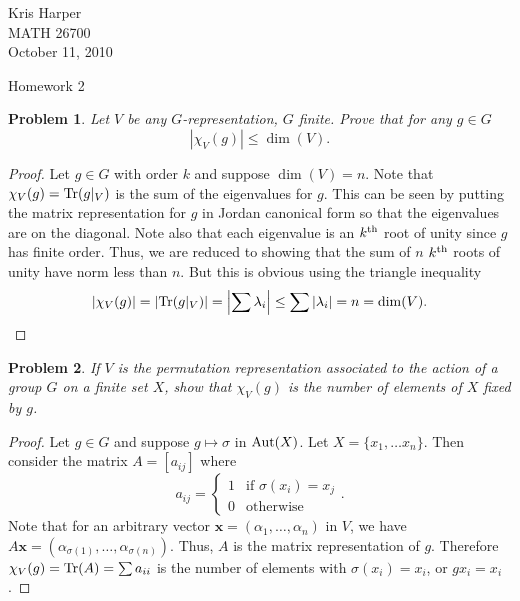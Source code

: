 \documentclass{article}
\newtheorem{problem}{Problem}
\renewcommand{\th}{^{\textup{th}}}
\newcommand{\tr}{\textup{Tr}}
\newcommand{\aut}{\textup{Aut}}
\begin{document}
\begin{flushright}
Kris Harper\\

MATH 26700\\

October 11, 2010
\end{flushright}

\begin{center}
Homework 2
\end{center}

\begin{problem}
Let $V$ be any $G$-representation, $G$ finite. Prove that for any $g \in G$
\[
| \chi_V(g) | \leq \dim (V).
\]
\end{problem}
\begin{proof}
Let $g \in G$ with order $k$ and suppose $\dim(V) = n$. Note that $\chi_V(g) = \tr(g|_V)$ is the sum of the eigenvalues for $g$. This can be seen by putting the matrix representation for $g$ in Jordan canonical form so that the eigenvalues are on the diagonal. Note also that each eigenvalue is an $k\th$ root of unity since $g$ has finite order. Thus, we are reduced to showing that the sum of $n$ $k\th$ roots of unity have norm less than $n$. But this is obvious using the triangle inequality
\[
|\chi_V(g)| = | \tr(g|_V) | = \left | \sum \lambda_i \right | \leq \sum | \lambda_i | = n = \dim(V).
\]
\end{proof}

\begin{problem}
If $V$ is the permutation representation associated to the action of a group $G$ on a finite set $X$, show that $\chi_V(g)$ is the number of elements of $X$ fixed by $g$.
\end{problem}
\begin{proof}
Let $g \in G$ and suppose $g \mapsto \sigma$ in $\aut(X)$. Let $X = \{x_1, \dots x_n\}$. Then consider the matrix $A = [a_{ij}]$ where
\[
a_{ij} =
\begin{cases}
1 & \text{if $\sigma(x_i) = x_j$}\\
0 & \text{otherwise}
\end{cases}.
\]
Note that for an arbitrary vector $\mathbf{x} = (\alpha_1, \dots , \alpha_n)$ in $V$, we have $A \mathbf{x} = (\alpha_{\sigma(1)}, \dots , \alpha_{\sigma(n)})$. Thus, $A$ is the matrix representation of $g$. Therefore $\chi_V(g) = \tr(A) = \sum a_{ii}$ is the number of elements with $\sigma(x_i) = x_i$, or $g x_i = x_i$.
\end{proof}
\end{document}

